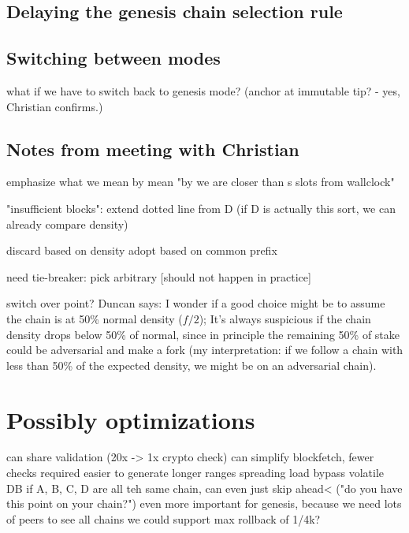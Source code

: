 \subsection{Delaying the genesis chain selection rule}





\subsection{Switching between modes}
\label{genesis:switching-between-modes}

what if we have to switch back to genesis mode?
(anchor at immutable tip? - yes, Christian confirms.)

\subsection{Notes from meeting with Christian}

emphasize what we mean by mean "by we are closer than s slots from wallclock"

"insufficient blocks": extend dotted line from D
(if D is actually this sort, we can already compare density)

discard based on density
adopt based on common prefix

need tie-breaker: pick arbitrary [should not happen in practice]

switch over point? Duncan says: I wonder if a good choice might be to assume the chain is at 50\% normal density ($f/2$); It's always suspicious if the chain density drops below 50\% of normal, since in principle the remaining 50\% of stake could be adversarial and make a fork (my interpretation: if we follow a chain with less than 50\% of the expected density, we might be on an adversarial chain).




\section{Possibly optimizations}

can share validation (20x -> 1x crypto check)
can simplify blockfetch, fewer checks required
  easier to generate longer ranges
  spreading load
bypass volatile DB
if A, B, C, D are all teh same chain, can even just skip ahead<
  ("do you have this point on your chain?")
even more important for genesis, because we need lots of peers
to see all chains
we could support max rollback of 1/4k?
